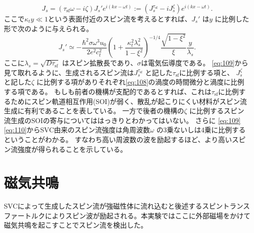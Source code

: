 \documentclass[dvipdfmx,11pt]{jsreport}
\numberwithin{equation}{chapter}
\numberwithin{table}{chapter}
\begin{document}
\begin{equation}
\label{eq:109}
J_s=\left(\tau_\text{sf} \omega-i\zeta  \right) J_s'e^{i(kx-\omega t)}:=\left( J_s^{\tau_\text{sf}} -iJ_s^{\zeta} \right) e^{i(kx-\omega t)}
.\end{equation}
ここで$\kappa_t y\ll 1$という表面付近のスピン流を考えるとすれば、$J_s'$ は$y$ に比例した形で次のように与えられる。
\begin{equation}
\label{eq:110}
	J_s' \simeq -\frac{\hbar^2\sigma\omega^3u_0}{2e^2c_t^2}\left( 1+\frac{\kappa_t^2\lambda_s^2}{1-\xi^2} \right) ^{-1 /4} \frac{\sqrt{1-\xi^2} }{\xi}\frac{y}{\lambda_s}
.\end{equation}
ここに$\lambda_s=\sqrt{D \tau_\text{sf} } $ はスピン拡散長であり、$\sigma$は電気伝導度である。
\eqref{eq:109}から見て取れるように、生成されるスピン流は$J_s^{\tau_\text{sf} }$ と記した$\tau_\text{sf} $に比例する項と、
$J_s^{\zeta}$ と記した$\zeta$ に比例する項がありそれぞれ\eqref{eq:108}の渦度の時間微分と渦度に比例する項である。
もしも前者の機構が支配的であるとすれば、これは$\tau_\text{sf} $に比例するためにスピン軌道相互作用(SOI)が弱く、散乱が起こりにくい材料がスピン流生成に有利であることを表している。
一方で後者の機構の$\zeta$ に比例するスピン流生成のSOIの寄与についてははっきりとわかってはいない。
さらに
\eqref{eq:109}\eqref{eq:110}からSVC由来のスピン流強度は角周波数$\omega$ の3乗ないしは4乗に比例するということがわかる。
すなわち高い周波数の波を励起するほど、より高いスピン流強度が得られることを示している。
\section{磁気共鳴}
SVCによって生成したスピン流が強磁性体に流れ込むと後述するスピントランスファートルクによりスピン波が励起される。本実験ではここに外部磁場をかけて磁気共鳴を起こすことでスピン流を検出した。
\end{document}
